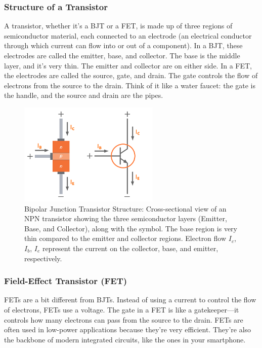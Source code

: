 \subsubsection*{Structure of a Transistor}
A transistor, whether it's a BJT or a FET, is made up of three regions of semiconductor material, each connected to an electrode (an electrical conductor through which current can flow into or out of a component). In a BJT, these electrodes are called the emitter, base, and collector. The base is the middle layer, and it's very thin. The emitter and collector are on either side. In a FET, the electrodes are called the source, gate, and drain. The gate controls the flow of electrons from the source to the drain. Think of it like a water faucet: the gate is the handle, and the source and drain are the pipes.

\begin{figure}[h!]
    \centering
    \includegraphics[width=0.6\textwidth]{images/bjt-transistor.png}
    \caption{Bipolar Junction Transistor Structure: Cross-sectional view of an NPN transistor showing the three semiconductor layers (Emitter, Base, and Collector), along with the symbol. The base region is very thin compared to the emitter and collector regions. Electron flow  $I_c$, $I_b$, $I_e$ represent the current on the collector, base, and emitter, respectively. }
    \label{fig:bjt_structure}
\end{figure}

\subsubsection*{Field-Effect Transistor (FET)}
FETs are a bit different from BJTs. Instead of using a current to control the flow of electrons, FETs use a voltage. The gate in a FET is like a gatekeeper—it controls how many electrons can pass from the source to the drain. FETs are often used in low-power applications because they’re very efficient. They’re also the backbone of modern integrated circuits, like the ones in your smartphone.

